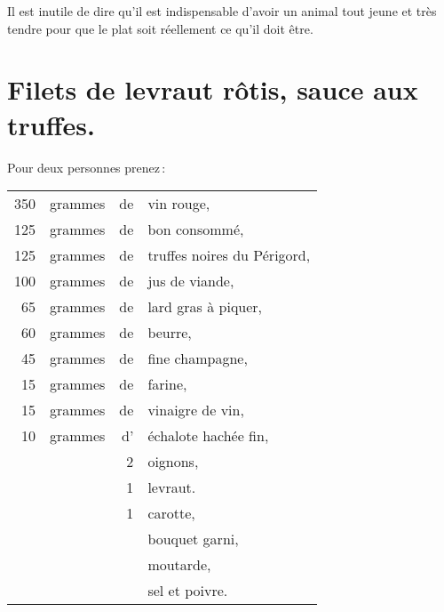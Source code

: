 \medskip

Il est inutile de dire qu'il est indispensable d'avoir un animal tout jeune et très
tendre pour que le plat soit réellement ce qu'il doit être.

\section*{\centering Filets de levraut rôtis, sauce aux truffes.}
{}

Pour deux personnes prenez :

\footnotesize
\begin{longtable}{rrrp{16em}}
    350 & grammes & de & vin rouge,                                                                       \\
    125 & grammes & de & bon consommé,                                                                    \\
    125 & grammes & de & truffes noires du Périgord,                                                      \\
    100 & grammes & de & jus de viande,                                                                   \\
     65 & grammes & de & lard gras à piquer,                                                              \\
     60 & grammes & de & beurre,                                                                          \\
     45 & grammes & de & fine champagne,                                                                  \\
     15 & grammes & de & farine,                                                                          \\
     15 & grammes & de & vinaigre de vin,                                                                 \\
     10 & grammes & d' & échalote hachée fin,                                                             \\
        &         &  2 & oignons,                                                                         \\
        &         &  1 & levraut.                                                                         \\
        &         &  1 & carotte,                                                                         \\
        &         &    & bouquet garni,                                                                   \\
        &         &    & moutarde,                                                                        \\
        &         &    & sel et poivre.                                                                   \\
\end{longtable}
\normalsize

